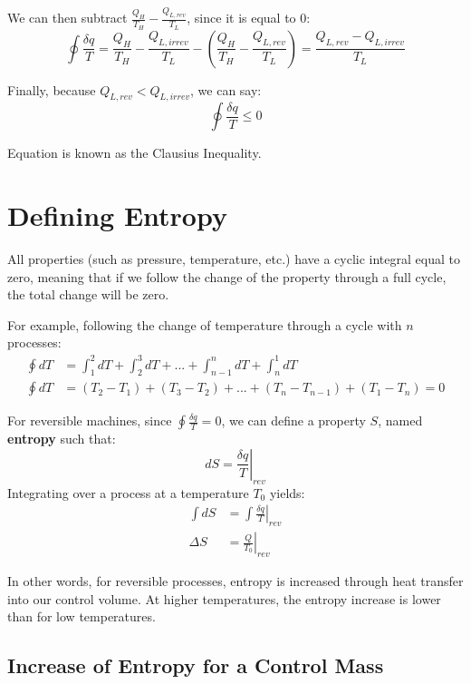 We can then subtract $\frac{Q_H}{T_H} - \frac{Q_{L,rev}}{T_L}$, since it is equal to 0:
\begin{equation*}
  \oint \frac{\delta q}{T} = \frac{Q_H}{T_H} - \frac{Q_{L,irrev}}{T_L} - \left(\frac{Q_H}{T_H} - \frac{Q_{L,rev}}{T_L}\right) =  \frac{Q_{L,rev} - Q_{L,irrev}}{T_L}
\end{equation*}

Finally, because $Q_{L,rev} < Q_{L, irrev}$, we can say:
\begin{equation}\label{eq:ClausiusInequality}
  \oint \frac{\delta q}{T} \le 0
\end{equation}

Equation \label{eq:ClausiusInequality} is known as the Clausius Inequality.

\section{Defining Entropy}
All properties (such as pressure, temperature, etc.) have a cyclic integral equal to zero, meaning that if we follow the change of the property through a full cycle, the total change will be zero.

For example, following the change of temperature through a cycle with $n$ processes:
\begin{align*}
  \oint dT &= \int_1^2 dT + \int_2^3 dT + ... + \int_{n-1}^n dT+ \int_n^1 dT\\
  \oint dT &= \left(T_2 - T_1\right) + \left(T_3 - T_2\right) + ... + \left(T_n - T_{n-1}\right) + \left(T_1 - T_n\right) = 0
\end{align*}

For reversible machines, since $\oint \frac{\delta q}{T} = 0$, we can define a property $S$, named {\bf entropy} such that:
\begin{equation} \label{eq:entropyDef}
  dS = \left.\frac{\delta q}{T}\right|_{rev}
\end{equation}
Integrating over a process at a temperature $T_0$ yields:
\begin{align*}
  \int dS &= \int \left.\frac{\delta q}{T}\right|_{rev} \\
  \Delta S &= \left.\frac{Q}{T_0}\right|_{rev}
\end{align*}

In other words, for reversible processes, entropy is increased through heat transfer into our control volume.  At higher temperatures, the entropy increase is lower than for low temperatures.

\subsection{Increase of Entropy for a Control Mass}

